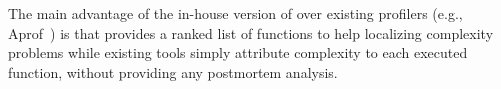 The main advantage of the in-house version of \Tool 
over existing profilers (e.g., Aprof~\cite{Aprof1,Aprof2}) is that 
\Tool provides a ranked list of functions to
help localizing complexity problems while 
existing tools simply attribute complexity to each executed function, 
without providing any postmortem analysis. 




